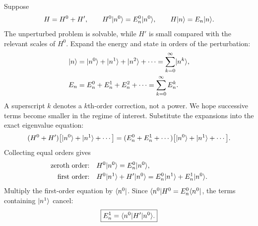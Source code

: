 Suppose
\[
 H=H^0+H',\qquad
 H^0\lvert n^0\rangle=E_n^0\lvert n^0\rangle,\qquad
 H\lvert n\rangle=E_n\lvert n\rangle.
\]
The unperturbed problem is solvable, while $H'$ is small compared with
the relevant scales of $H^0$. Expand the energy and state in orders of
the perturbation:
\begin{align*}
 \lvert n\rangle&=\lvert n^0\rangle+\lvert n^1\rangle+\lvert n^2\rangle+\cdots
        =\sum_{k=0}^{\infty}\lvert n^k\rangle,\\
 E_n&=E_n^0+E_n^1+E_n^2+\cdots=\sum_{k=0}^{\infty}E_n^k.
\end{align*}
A superscript $k$ denotes a $k$th-order correction, not a power. We hope
successive terms become smaller in the regime of interest.
Substitute the expansions into the exact eigenvalue equation:
\[
 (H^0+H')\bigl[\lvert n^0\rangle+\lvert n^1\rangle+\cdots\bigr]
 =(E_n^0+E_n^1+\cdots)\bigl[\lvert n^0\rangle+\lvert n^1\rangle+\cdots\bigr].
\]
Collecting equal orders gives
\begin{align*}
 \text{zeroth order:}\quad&H^0\lvert n^0\rangle=E_n^0\lvert n^0\rangle,\\
 \text{first order:}\quad&H^0\lvert n^1\rangle+H'\lvert n^0\rangle
                   =E_n^0\lvert n^1\rangle+E_n^1\lvert n^0\rangle.
\end{align*}
Multiply the first-order equation by $\langle n^0\rvert$. Since
$\langle n^0\rvert H^0=E_n^0\langle n^0\rvert$, the terms containing $\lvert n^1\rangle$ cancel:
\[
 \boxed{E_n^1=\langle n^0\rvert H'\lvert n^0\rangle.}
\]

